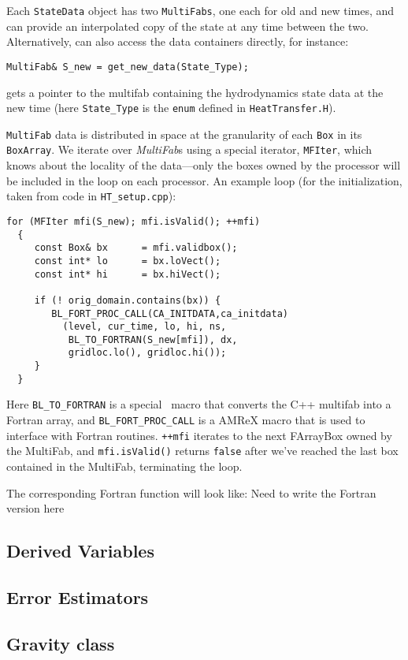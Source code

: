 Each {\tt StateData} object has two {\tt MultiFabs}, one each for 
old and new times, and can provide an interpolated copy of the state at any time between the two.
Alternatively, can also access the data containers directly, for instance:
\begin{lstlisting}
MultiFab& S_new = get_new_data(State_Type);
\end{lstlisting}
gets a pointer to the multifab containing the hydrodynamics state data
at the new time (here {\tt State\_Type} is the {\tt enum} defined in 
{\tt HeatTransfer.H}).

{\tt MultiFab} data is distributed in space at the granularity of 
each {\tt Box} in its {\tt BoxArray}.  We iterate over {\it MultiFab}s using a special
iterator, {\tt MFIter}, which knows about the locality of the data---only the boxes owned by the
processor will be included in the loop on each processor.  An example loop (for the
initialization, taken from code in {\tt HT\_setup.cpp}):
\begin{lstlisting}
for (MFIter mfi(S_new); mfi.isValid(); ++mfi)
  {
     const Box& bx      = mfi.validbox();
     const int* lo      = bx.loVect();
     const int* hi      = bx.hiVect();

     if (! orig_domain.contains(bx)) {
        BL_FORT_PROC_CALL(CA_INITDATA,ca_initdata)
          (level, cur_time, lo, hi, ns,
           BL_TO_FORTRAN(S_new[mfi]), dx,
           gridloc.lo(), gridloc.hi());
     }
  }
\end{lstlisting}
Here {\tt BL\_TO\_FORTRAN} is a special \amrex\ macro that converts the
C++ multifab into a Fortran array, and {\tt BL\_FORT\_PROC\_CALL}
is a AMReX macro that is used to interface with Fortran routines. 
{\tt ++mfi} iterates to the next FArrayBox owned by the MultiFab, 
and {\tt mfi.isValid()} returns {\tt false} after we've reached 
the last box contained in the MultiFab, terminating the loop.

The corresponding Fortran function will look like:
{\color{red} Need to write the Fortran version here}


\subsection{Derived Variables}

\subsection{Error Estimators}


\subsection{Gravity class}


